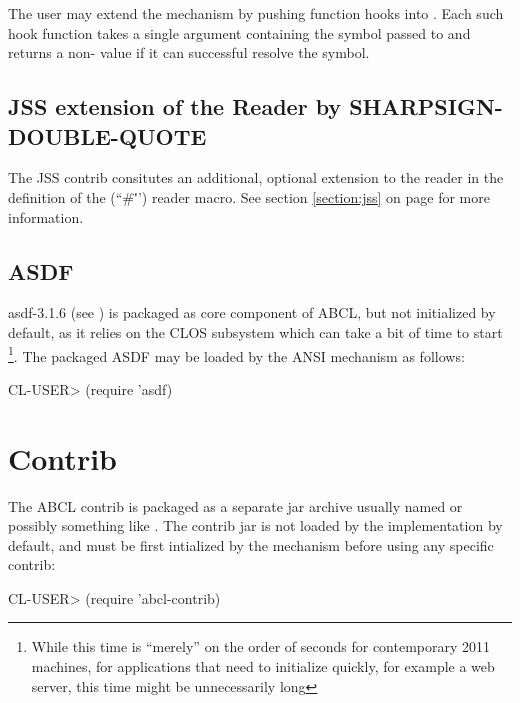 \documentclass[10pt]{book}
\begin{document}
The user may extend the  mechanism by pushing
function hooks into .  Each
such hook function takes a single argument containing the symbol
passed to  and returns a non- value if it
can successful resolve the symbol.

\section{JSS extension of the Reader by SHARPSIGN-DOUBLE-QUOTE}

The JSS contrib consitutes an additional, optional extension to the
reader in the definition of the 
(``\#\"'') reader macro.  See section \ref{section:jss} on page
\pageref{section:jss} for more information.

\section{ASDF}

asdf-3.1.6 (see \cite{asdf}) is packaged as core component of \textsc{ABCL},
but not initialized by default, as it relies on the \textsc{CLOS} subsystem
which can take a bit of time to start \footnote{While this time is
  ``merely'' on the order of seconds for contemporary 2011 machines,
  for applications that need to initialize quickly, for example a web
  server, this time might be unnecessarily long}.  The packaged \textsc{ASDF}
may be loaded by the \textsc{ANSI}  mechanism as
follows:

\begin{listing-lisp}
CL-USER> (require 'asdf)
\end{listing-lisp}

\chapter{Contrib}

The \textsc{ABCL} contrib is packaged as a separate jar archive usually named
 or possibly something like
.  The contrib jar is not loaded by the
implementation by default, and must be first intialized by the
 mechanism before using any specific contrib:

\begin{listing-lisp}
CL-USER> (require 'abcl-contrib)
\end{listing-lisp}
\end{document}
